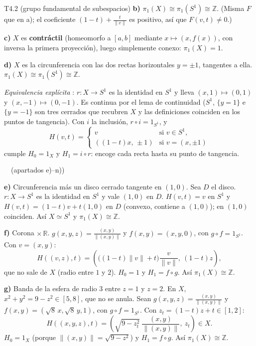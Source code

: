 \begin{ejercicio}{T4.2 (grupo fundamental de subespacios)}
\textbf{b)} $\pi_1(X) \cong \pi_1(S^1) \cong \mathbb{Z}$. (Misma $F$ que en a); el coeficiente $(1-t) + \frac{t}{\|v\|}$ es positivo, así que $F(v,t) \neq 0$.)

\textbf{c)} $X$ es \textbf{contráctil} (homeomorfo a $[a,b]$ mediante $x \mapsto (x,f(x))$, con inversa la primera proyección), luego simplemente conexo: $\pi_1(X) = 1$.

\textbf{d)} $X$ es la circunferencia con las dos rectas horizontales $y = \pm 1$, tangentes a ella. $\pi_1(X) \cong \pi_1(S^1) \cong \mathbb{Z}$.

\emph{Equivalencia explícita} \fuentepropia: $r \colon X \to S^1$ es la identidad en $S^1$ y lleva $(x,1) \mapsto (0,1)$ y $(x,-1) \mapsto (0,-1)$. Es continua por el lema de continuidad ($S^1$, $\{y = 1\}$ e $\{y = -1\}$ son tres cerrados que recubren $X$ y las definiciones coinciden en los puntos de tangencia). Con $i$ la inclusión, $r \circ i = 1_{S^1}$, y
\[ H(v,t) = \begin{cases} v & \text{si } v \in S^1, \\ ((1-t)x,\, \pm 1) & \text{si } v = (x,\pm 1) \end{cases} \]
cumple $H_0 = 1_X$ y $H_1 = i \circ r$: encoge cada recta hasta su punto de tangencia.

\medskip
\fuentepropia\ \ (apartados e)--n))

\textbf{e)} Circunferencia más un disco cerrado tangente en $(1,0)$. Sea $D$ el disco. $r \colon X \to S^1$ es la identidad en $S^1$ y vale $(1,0)$ en $D$. $H(v,t) = v$ en $S^1$ y $H(v,t) = (1-t)v + t(1,0)$ en $D$ (convexo, contiene a $(1,0)$); en $(1,0)$ coinciden. Así $X \simeq S^1$ y $\pi_1(X) \cong \mathbb{Z}$.

\textbf{f)} Corona $\times\,\mathbb{R}$. $g(x,y,z) = \frac{(x,y)}{\|(x,y)\|}$ y $f(x,y) = (x,y,0)$, con $g \circ f = 1_{S^1}$. Con $v = (x,y)$:
\[ H((v,z),t) = \left( \big((1-t)\|v\| + t\big)\frac{v}{\|v\|},\ (1-t)z \right), \]
que no sale de $X$ (radio entre $1$ y $2$). $H_0 = 1$ y $H_1 = f \circ g$. Así $\pi_1(X) \cong \mathbb{Z}$.

\textbf{g)} Banda de la esfera de radio $3$ entre $z = 1$ y $z = 2$. En $X$, $x^2+y^2 = 9 - z^2 \in [5,8]$, que no se anula. Sean $g(x,y,z) = \frac{(x,y)}{\|(x,y)\|}$ y $f(x,y) = (\sqrt8\,x,\sqrt8\,y,1)$, con $g \circ f = 1_{S^1}$. Con $z_t = (1-t)z + t \in [1,2]$:
\[ H((x,y,z),t) = \left( \sqrt{9 - z_t^2}\ \frac{(x,y)}{\|(x,y)\|},\ z_t \right) \in X. \]
$H_0 = 1_X$ (porque $\|(x,y)\| = \sqrt{9-z^2}$) y $H_1 = f \circ g$. Así $\pi_1(X) \cong \mathbb{Z}$.


\end{ejercicio}
